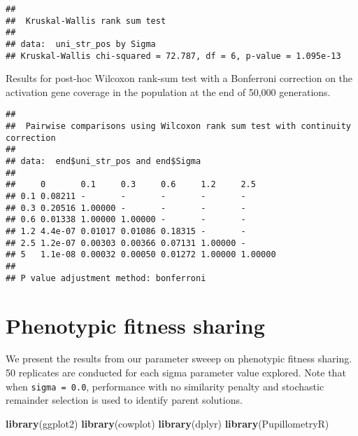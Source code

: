 \documentclass[]{book}
\newenvironment{Shaded}{\begin{snugshade}}{\end{snugshade}}
\newcommand{\DataTypeTok}[1]{\textcolor[rgb]{0.13,0.29,0.53}{#1}}
\newcommand{\KeywordTok}[1]{\textcolor[rgb]{0.13,0.29,0.53}{\textbf{#1}}}
\newcommand{\NormalTok}[1]{#1}
\newcommand{\OperatorTok}[1]{\textcolor[rgb]{0.81,0.36,0.00}{\textbf{#1}}}
\newcommand{\OtherTok}[1]{\textcolor[rgb]{0.56,0.35,0.01}{#1}}
\newcommand{\StringTok}[1]{\textcolor[rgb]{0.31,0.60,0.02}{#1}}
\begin{document}
\begin{verbatim}
## 
##  Kruskal-Wallis rank sum test
## 
## data:  uni_str_pos by Sigma
## Kruskal-Wallis chi-squared = 72.787, df = 6, p-value = 1.095e-13
\end{verbatim}

Results for post-hoc Wilcoxon rank-sum test with a Bonferroni correction on the activation gene coverage in the population at the end of 50,000 generations.

\begin{Shaded}
\end{Shaded}

\begin{verbatim}
## 
##  Pairwise comparisons using Wilcoxon rank sum test with continuity correction 
## 
## data:  end$uni_str_pos and end$Sigma 
## 
##     0       0.1     0.3     0.6     1.2     2.5    
## 0.1 0.08211 -       -       -       -       -      
## 0.3 0.20516 1.00000 -       -       -       -      
## 0.6 0.01338 1.00000 1.00000 -       -       -      
## 1.2 4.4e-07 0.01017 0.01086 0.18315 -       -      
## 2.5 1.2e-07 0.00303 0.00366 0.07131 1.00000 -      
## 5   1.1e-08 0.00032 0.00050 0.01272 1.00000 1.00000
## 
## P value adjustment method: bonferroni
\end{verbatim}

\hypertarget{phenotypic-fitness-sharing}{%
\chapter{Phenotypic fitness sharing}\label{phenotypic-fitness-sharing}}

We present the results from our parameter sweeep on phenotypic fitness sharing.
50 replicates are conducted for each sigma parameter value explored.
Note that when \texttt{sigma\ =\ 0.0}, performance with no similarity penalty and stochastic remainder selection is used to identify parent solutions.

\begin{Shaded}
\begin{Highlighting}[]
\KeywordTok{library}\NormalTok{(ggplot2)}
\KeywordTok{library}\NormalTok{(cowplot)}
\KeywordTok{library}\NormalTok{(dplyr)}
\KeywordTok{library}\NormalTok{(PupillometryR)}
\end{Highlighting}
\end{Shaded}
\end{document}
